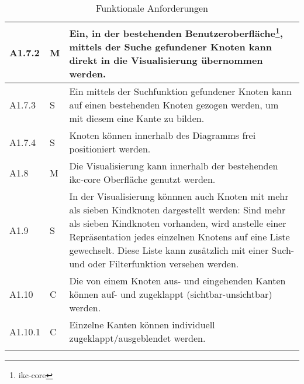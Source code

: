 \begin{longtable}{|p{1.5cm} | p{1.5cm} | p{8.1cm}|}
    A1.7.2 & M & Ein, in der bestehenden Benutzeroberfläche\footnote{\gls{ikc-core}}, mittels der Suche gefundener Knoten kann direkt in die Visualisierung übernommen werden.\\\hline 
    A1.7.3 & S & Ein mittels der Suchfunktion gefundener Knoten kann auf einen bestehenden Knoten gezogen werden, um mit diesem eine Kante zu bilden.\\\hline 
    A1.7.4 & S & Knoten können innerhalb des Diagramms frei positioniert werden.\\\hline 
    A1.8 & M & Die Visualisierung kann innerhalb der bestehenden \gls{ikc-core} Oberfläche genutzt werden.\\\hline 
    A1.9 & S & In der Visualisierung könnnen auch Knoten mit mehr als sieben Kindknoten dargestellt werden: Sind mehr als sieben Kindknoten vorhanden, wird anstelle einer Repräsentation jedes einzelnen Knotens auf eine Liste gewechselt. Diese Liste kann zusätzlich mit einer Such- und oder Filterfunktion versehen werden.\\\hline  
    A1.10 & C & Die von einem Knoten aus- und eingehenden Kanten können auf- und zugeklappt (sichtbar-unsichtbar) werden.\\\hline
    A1.10.1 & C & Einzelne Kanten können individuell zugeklappt/ausgeblendet werden.\\\hline
     
    \caption{Funktionale Anforderungen}
  \label{tab:funktionale-anforderungen}
\end{longtable}

